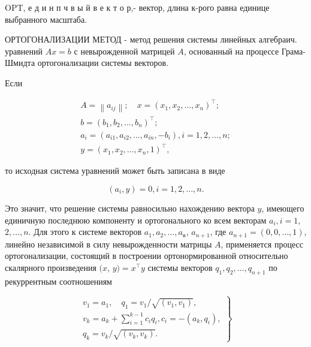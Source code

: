 \documentclass[10pt]{article}
\begin{document}
OPT, е д и н п ч в ы й в е к т о р,- вектор, длина к-рого равна единице выбранного масштаба.



ОРТОГОНАЛИЗАЦИИ МЕТОД - метод решения системы линейных алгебраич. уравнений $A x=b$ с невырожденной матрицей $A$, основанный на процессе Грама-Шмидта ортогонализации системы векторов.



Если



\[

\begin{gathered}

A=\left\|a_{i j}\right\| ; \quad x=\left(x_{1}, x_{2}, \ldots, x_{n}\right)^{\top} ; \\

b=\left(b_{1}, b_{2}, \ldots, b_{n}\right)^{\top} ; \\

a_{i}=\left(a_{i 1}, a_{i 2}, \ldots, a_{i n},-b_{i}\right), i=1,2, \ldots, n ; \\

y=\left(x_{1}, x_{2}, \ldots, x_{n}, 1\right)^{\top},

\end{gathered}

\]



то исходная система уравнений может быть записана в виде



\[

\left(a_{i}, y\right)=0, i=1,2, \ldots, n .

\]



Это значит, что решение системы равносильно нахождению вектора $y$, имеющего единичную последнюю компоненту и ортогонального ко всем векторам $a_{i}, i=1$, $2, \ldots, n$. Для этого к системе векторов $a_{1}, a_{2}, \ldots, a_{\mathfrak{n}}$, $a_{n+1}$, где $a_{n+1}=(0,0, \ldots, 1)$, линейно независимой в силу невырожденности матрицы $A$, применяется процесс ортогонализации, состоящий в построении ортонормированной относительно скалярного произведения $(x$, $y)=x^{\top} y$ системы векторов $q_{1}, q_{2}, \ldots, q_{n+1}$ по рекуррентным соотношениям



\[

\left.\begin{array}{c}

v_{1}=a_{1}, \quad q_{1}=v_{1} / \sqrt{\left(v_{1}, v_{1}\right)}, \\

v_{k}=a_{k}+\sum_{i=1}^{k-1} c_{i} q_{i}, c_{i}=-\left(a_{k}, q_{i}\right), \\

q_{k}=v_{k} / \sqrt{\left(v_{k}, v_{k}\right)} .

\end{array}\right\}

\]
\end{document}
